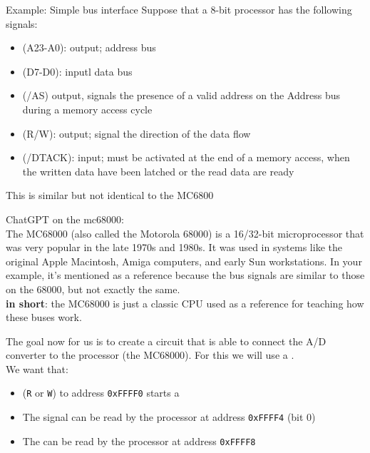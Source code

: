 \begin{parag}{Example: Simple bus interface}
    Suppose that a 8-bit processor has the following signals:
	\begin{itemize}
	    \item {} (A23-A0): output; address bus
		\item {} (D7-D0): inputl data bus 
		\item {} (/AS) output, signals the presence of a valid address on the Address bus during a memory access cycle
		\item {} (R/W): output; signal the direction of the data flow
		\item {} (/DTACK): input; must be activated at the end of a memory access, when the written data have been latched or the read data are ready 
	\end{itemize}
	This is similar but not identical to the MC6800
	\begin{framedremark}
	ChatGPT on the mc68000:\\
	The MC68000 (also called the Motorola 68000) is a 16/32-bit microprocessor that was very popular in the late 1970s and 1980s. It was used in systems like the original Apple Macintosh, Amiga computers, and early Sun workstations. In your example, it’s mentioned as a reference because the bus signals are similar to those on the 68000, but not exactly the same.\\
	\textbf{in short}: the MC68000 is just a classic CPU used as a reference for teaching how these buses work.
	\end{framedremark}
	
\end{parag}
The goal now for us is to create a circuit that is able to connect the A/D converter to the processor (the MC68000). For this we will use a . \\
We want that:
\begin{itemize}
    \item {} (\texttt{R} or \texttt{W}) to address \texttt{0xFFFF0} starts a 
    \item The  signal can be read by the processor at address \texttt{0xFFFF4} (bit 0)
    \item The  can be read by the processor at address \texttt{0xFFFF8}
\end{itemize}

